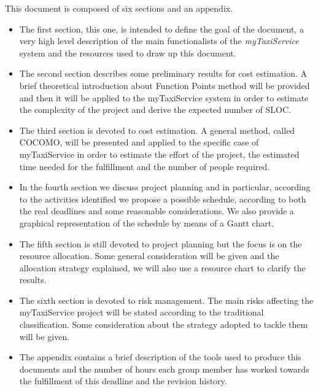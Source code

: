 This document is composed of six sections and an appendix.
\begin{itemize}
\item The first section, this one, is intended to define the goal of the
document, a very high level description of the main functionalists
of the \emph{myTaxiService} system and the resources used to draw
up this document.
\item The second section describes some preliminary results for cost estimation.
A brief theoretical introduction about Function Points method will
be provided and then it will be applied to the myTaxiService system
in order to estimate the complexity of the project and derive the
expected number of SLOC.
\item The third section is devoted to cost estimation. A general method,
called COCOMO, will be presented and applied to the specific case
of myTaxiService in order to estimate the effort of the project, the
estimated time needed for the fulfillment and the number of people
required.
\item In the fourth section we discuss project planning and in particular,
according to the activities identified we propose a possible schedule,
according to both the real deadlines and some reasonable considerations.
We also provide a graphical representation of the schedule by means
of a Gantt chart. 
\item The fifth section is still devoted to project planning but the focus
is on the resource allocation. Some general consideration will be
given and the allocation strategy explained, we will also use a resource
chart to clarify the results.
\item The sixth section is devoted to risk management. The main risks affecting
the myTaxiService project will be stated according to the traditional
classification. Some consideration about the strategy adopted to tackle
them will be given.
\item The appendix contains a brief description of the tools used to produce
this documents and the number of hours each group member has worked
towards the fulfillment of this deadline and the revision history.\end{itemize}

